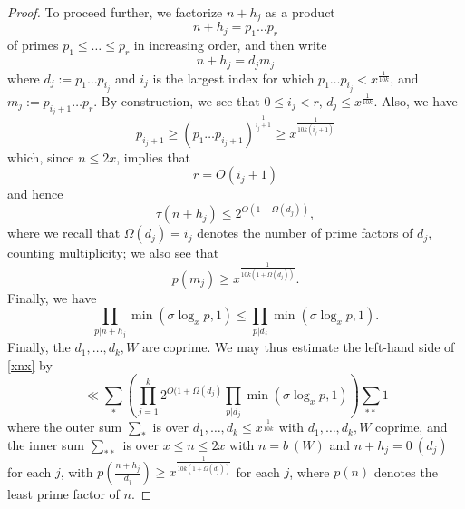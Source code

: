 \begin{proof}
To proceed further, we factorize $n+h_j$ as a product
$$ n+h_j = p_1 \dots p_r$$
of primes $p_1 \leq \dots \leq p_r$ in increasing order, and then write 
$$ n+h_j = d_j m_j$$
where $d_j := p_1 \dots p_{i_j}$ and $i_j$ is the largest index for which $p_1 \dots p_{i_j} < x^{\frac{1}{10k}}$, and $m_j := p_{i_j+1} \dots p_r$.  By construction, we see that $0 \leq i_j < r$, $d_j \leq x^{\frac{1}{10k}}$.  Also, we have
$$ p_{i_j+1} \geq (p_1 \dots p_{i_j+1})^{\frac{1}{i_j+1}} \geq x^{\frac{1}{10k(i_j+1)}}$$
which, since $n \leq 2x$, implies that
$$ r = O( i_j + 1 )$$
and hence
$$ \tau(n+h_j) \leq 2^{O(1+\Omega(d_j))},$$
where we recall that $\Omega(d_j) = i_j$ denotes the number of prime factors of $d_j$, counting multiplicity; we also see that
$$ p(m_j) \geq x^{\frac{1}{10k(1+\Omega(d_j))}}.$$
Finally, we have
$$ \prod_{p|n+h_j} \min(\sigma \log_x p,1) \leq \prod_{p|d_j} \min( \sigma \log_x p, 1 ).$$
Finally, the $d_1,\dots,d_k,W$ are coprime.  We may thus estimate the left-hand side of \eqref{xnx} by
$$ 
\ll \sum_* (\prod_{j=1}^k 2^{O(1+\Omega(d_j)} \prod_{p|d_j} \min( \sigma \log_x p, 1 )) \sum_{**} 1$$
where the outer sum $\sum_*$ is over $d_1,\dots,d_k \leq x^{\frac{1}{10k}}$ with $d_1,\dots,d_k,W$ coprime, and the inner sum $\sum_{**}$ is over $x \leq n \leq 2x$ with $n = b\ (W)$ and $n + h_j = 0\ (d_j)$ for each $j$, with $p( \frac{n+h_j}{d_j}) \geq x^{\frac{1}{10k(1+\Omega(d_j))}}$ for each $j$, where $p(n)$ denotes the least prime factor of $n$.


\end{proof}
